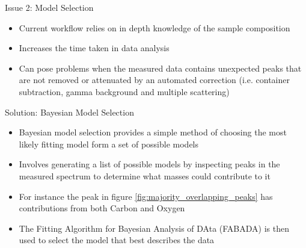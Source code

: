 \documentclass[xcolor={dvipsnames}]{beamer}
\begin{document}
\begin{frame}{}
\begin{columns}[t]
    \begin{column}{.49\linewidth}
      \begin{block}{\LARGE Issue 2: Model Selection}
        \begin{itemize}
          \item Current workflow relies on in depth knowledge of the sample
                composition
          \item Increases the time taken in data analysis
          \item Can pose problems when the measured data contains unexpected
                peaks that are not removed or attenuated by an automated
                correction (i.e. container subtraction, gamma background and
                multiple scattering)
        \end{itemize}
      \end{block}

      \begin{block}{\LARGE Solution: Bayesian Model Selection}
        \begin{itemize}
          \item Bayesian model selection provides a simple method of choosing
                the most likely fitting model form a set of possible models
          \item Involves generating a list of possible models by inspecting
                peaks in the measured spectrum to determine what masses could
                contribute to it
          \item For instance the peak in figure
                \ref{fig:majority_overlapping_peaks} has contributions from both
                Carbon and Oxygen
          \item The Fitting Algorithm for Bayesian Analysis of DAta (FABADA)
                \cite{fabada} is then used to select the model that best
                describes the data
        \end{itemize}


\end{block}
\end{column}
\end{columns}
\end{frame}
\end{document}
